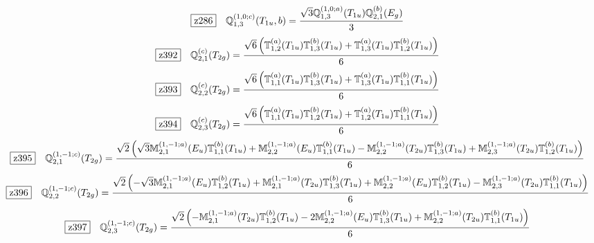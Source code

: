 \documentclass[fleqn,10pt,landscape]{jsarticle}
\begin{document}
\begin{dmath*}
\hspace*{3mm}\fbox{z286}\quad \mathbb{Q}_{1,3}^{(1,0;c)}(T_{1u},b)=\frac{\sqrt{3} \mathbb{Q}_{1,3}^{(1,0;a)}(T_{1u}) \mathbb{Q}_{2,1}^{(b)}(E_{g})}{3}
\end{dmath*}
\begin{dmath*}
\hspace*{3mm}\fbox{z392}\quad \mathbb{Q}_{2,1}^{(c)}(T_{2g})=\frac{\sqrt{6} \left(\mathbb{T}_{1,2}^{(a)}(T_{1u}) \mathbb{T}_{1,3}^{(b)}(T_{1u}) + \mathbb{T}_{1,3}^{(a)}(T_{1u}) \mathbb{T}_{1,2}^{(b)}(T_{1u})\right)}{6}
\end{dmath*}
\begin{dmath*}
\hspace*{3mm}\fbox{z393}\quad \mathbb{Q}_{2,2}^{(c)}(T_{2g})=\frac{\sqrt{6} \left(\mathbb{T}_{1,1}^{(a)}(T_{1u}) \mathbb{T}_{1,3}^{(b)}(T_{1u}) + \mathbb{T}_{1,3}^{(a)}(T_{1u}) \mathbb{T}_{1,1}^{(b)}(T_{1u})\right)}{6}
\end{dmath*}
\begin{dmath*}
\hspace*{3mm}\fbox{z394}\quad \mathbb{Q}_{2,3}^{(c)}(T_{2g})=\frac{\sqrt{6} \left(\mathbb{T}_{1,1}^{(a)}(T_{1u}) \mathbb{T}_{1,2}^{(b)}(T_{1u}) + \mathbb{T}_{1,2}^{(a)}(T_{1u}) \mathbb{T}_{1,1}^{(b)}(T_{1u})\right)}{6}
\end{dmath*}
\begin{dmath*}
\hspace*{3mm}\fbox{z395}\quad \mathbb{Q}_{2,1}^{(1,-1;c)}(T_{2g})=\frac{\sqrt{2} \left(\sqrt{3} \mathbb{M}_{2,1}^{(1,-1;a)}(E_{u}) \mathbb{T}_{1,1}^{(b)}(T_{1u}) + \mathbb{M}_{2,2}^{(1,-1;a)}(E_{u}) \mathbb{T}_{1,1}^{(b)}(T_{1u}) - \mathbb{M}_{2,2}^{(1,-1;a)}(T_{2u}) \mathbb{T}_{1,3}^{(b)}(T_{1u}) + \mathbb{M}_{2,3}^{(1,-1;a)}(T_{2u}) \mathbb{T}_{1,2}^{(b)}(T_{1u})\right)}{6}
\end{dmath*}
\begin{dmath*}
\hspace*{3mm}\fbox{z396}\quad \mathbb{Q}_{2,2}^{(1,-1;c)}(T_{2g})=\frac{\sqrt{2} \left(- \sqrt{3} \mathbb{M}_{2,1}^{(1,-1;a)}(E_{u}) \mathbb{T}_{1,2}^{(b)}(T_{1u}) + \mathbb{M}_{2,1}^{(1,-1;a)}(T_{2u}) \mathbb{T}_{1,3}^{(b)}(T_{1u}) + \mathbb{M}_{2,2}^{(1,-1;a)}(E_{u}) \mathbb{T}_{1,2}^{(b)}(T_{1u}) - \mathbb{M}_{2,3}^{(1,-1;a)}(T_{2u}) \mathbb{T}_{1,1}^{(b)}(T_{1u})\right)}{6}
\end{dmath*}
\begin{dmath*}
\hspace*{3mm}\fbox{z397}\quad \mathbb{Q}_{2,3}^{(1,-1;c)}(T_{2g})=\frac{\sqrt{2} \left(- \mathbb{M}_{2,1}^{(1,-1;a)}(T_{2u}) \mathbb{T}_{1,2}^{(b)}(T_{1u}) - 2 \mathbb{M}_{2,2}^{(1,-1;a)}(E_{u}) \mathbb{T}_{1,3}^{(b)}(T_{1u}) + \mathbb{M}_{2,2}^{(1,-1;a)}(T_{2u}) \mathbb{T}_{1,1}^{(b)}(T_{1u})\right)}{6}
\end{dmath*}
\end{document}
